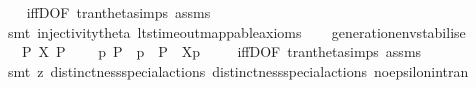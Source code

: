\begin{isabellebody}
%
\isadelimproof
\ \ %
\endisadelimproof
%
\isatagproof
{}\isamarkupfalse%
\ iffD{}{\isacharbrackleft}{\kern0pt}OF\ tran{\isacharunderscore}{\kern0pt}theta{\isachardot}{\kern0pt}simps\ assms{\isacharbrackright}{\kern0pt}\isanewline
\ \ \isamarkupfalse%
\ {\isacharparenleft}{\kern0pt}smt\ injectivity{\isacharunderscore}{\kern0pt}theta{\isacharparenleft}{\kern0pt}{}{\isacharcomma}{\kern0pt}{}{\isacharparenright}{\kern0pt}\ lts{\isacharunderscore}{\kern0pt}timeout{\isacharunderscore}{\kern0pt}mappable{\isacharunderscore}{\kern0pt}axioms{\isacharparenright}{\kern0pt}%
\endisatagproof
{\isafoldproof}%
%
\isadelimproof
\isanewline
%
\endisadelimproof
\ \ \isanewline
{}\isamarkupfalse%
\ generation{\isacharunderscore}{\kern0pt}env{\isacharunderscore}{\kern0pt}stabilise{\isacharcolon}{\kern0pt}\isanewline
\ \ \ {\isacartoucheopen}P\ {\isasymlongmapsto}\isactrlsup {\isasymtheta}{\isasymepsilon}{\isacharbrackleft}{\kern0pt}X{\isacharbrackright}{\kern0pt}\ P{\isacharprime}{\kern0pt}{\isacartoucheclose}\isanewline
\ \ \ {\isacartoucheopen}{\isasymexists}\ p{\isachardot}{\kern0pt}\ P\ {\isacharequal}{\kern0pt}\ {\isasymtheta}{\isacharparenleft}{\kern0pt}p{\isacharparenright}{\kern0pt}\ {\isasymand}\ P{\isacharprime}{\kern0pt}\ {\isacharequal}{\kern0pt}\ {\isasymtheta}{\isacharbrackleft}{\kern0pt}X{\isacharbrackright}{\kern0pt}{\isacharparenleft}{\kern0pt}p{\isacharparenright}{\kern0pt}{\isacartoucheclose}\ \isanewline
%
\isadelimproof
\ \ %
\endisadelimproof
%
\isatagproof
{}\isamarkupfalse%
\ iffD{}{\isacharbrackleft}{\kern0pt}OF\ tran{\isacharunderscore}{\kern0pt}theta{\isachardot}{\kern0pt}simps\ assms{\isacharparenleft}{\kern0pt}{}{\isacharparenright}{\kern0pt}{\isacharbrackright}{\kern0pt}\ \isanewline
\ \ \isamarkupfalse%
\ {\isacharparenleft}{\kern0pt}smt\ {\isacharparenleft}{\kern0pt}z{}{\isacharparenright}{\kern0pt}\ distinctness{\isacharunderscore}{\kern0pt}special{\isacharunderscore}{\kern0pt}actions{\isacharparenleft}{\kern0pt}{}{\isacharparenright}{\kern0pt}\ distinctness{\isacharunderscore}{\kern0pt}special{\isacharunderscore}{\kern0pt}actions{\isacharparenleft}{\kern0pt}{}{\isacharparenright}{\kern0pt}\ no{\isacharunderscore}{\kern0pt}epsilon{\isacharunderscore}{\kern0pt}in{\isacharunderscore}{\kern0pt}tran{\isacharparenleft}{\kern0pt}{}{\isacharparenright}{\kern0pt}{\isacharparenright}{\kern0pt}%
\endisatagproof
{\isafoldproof}%
%

\end{isabellebody}
